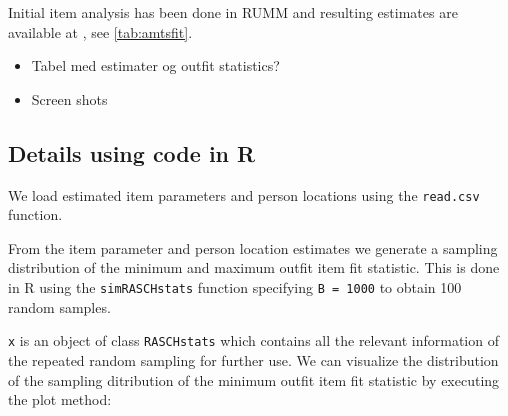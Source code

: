\documentclass[11pt,a4paper]{article}
\begin{document}
Initial item analysis has been done in RUMM and resulting estimates are available at , see \autoref{tab:amtsfit}. 

{\color{red}
\begin{itemize}
 \item Tabel med estimater og outfit statistics?
 \item Screen shots
\end{itemize}
}

\subsection{Details using code in R}

%
%
%
%

We load estimated item parameters and person locations using the \texttt{read.csv} function.



From the item parameter and person location estimates we generate a sampling distribution of the minimum and maximum outfit item fit statistic. This is done in R using the \texttt{simRASCHstats} function specifying \texttt{B = 1000} to obtain 100 random samples.



\texttt{x} is an object of class \texttt{RASCHstats} which contains all the relevant information of the repeated random sampling for further use. 
We can visualize the distribution of the sampling ditribution of the minimum outfit item fit statistic by executing the plot method:
\end{document}
